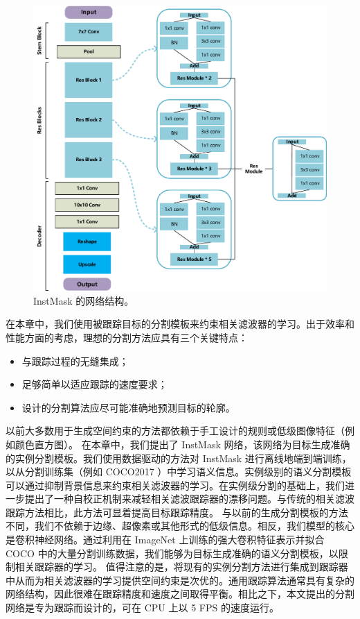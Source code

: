 \begin{figure}[t]
    \centering
    \includegraphics[width=1.0\textwidth]{Img/IGCF/net.pdf}
    \caption{InstMask 的网络结构。}
    \label{fig:net}
\end{figure}

在本章中，我们使用被跟踪目标的分割模板来约束相关滤波器的学习。出于效率和性能方面的考虑，理想的分割方法应具有三个关键特点：

\begin{itemize}
\item 与跟踪过程的无缝集成；
\item 足够简单以适应跟踪的速度要求；
\item 设计的分割算法应尽可能准确地预测目标的轮廓。
\end{itemize}

以前大多数用于生成空间约束的方法都依赖于手工设计的规则或低级图像特征（例如颜色直方图）。
在本章中，我们提出了 InstMask 网络，该网络为目标生成准确的实例分割模板。我们使用数据驱动的方法对 InstMask 进行离线地端到端训练，以从分割训练集（例如 COCO2017 \cite{COCO}）中学习语义信息。实例级别的语义分割模板可以通过抑制背景信息来约束相关滤波器的学习。在实例级分割的基础上，我们进一步提出了一种自校正机制来减轻相关滤波跟踪器的漂移问题。与传统的相关滤波跟踪方法相比，此方法可显着提高目标跟踪精度。
与以前的生成分割模板的方法不同，我们不依赖于边缘、超像素或其他形式的低级信息。相反，我们模型的核心是卷积神经网络。通过利用在 ImageNet \cite{ImageNet} 上训练的强大卷积特征表示并拟合 COCO 中的大量分割训练数据，我们能够为目标生成准确的语义分割模板，以限制相关跟踪器的学习。
值得注意的是，将现有的实例分割方法进行集成到跟踪器中从而为相关滤波器的学习提供空间约束是次优的。通用跟踪算法通常具有复杂的网络结构，因此很难在跟踪精度和速度之间取得平衡。相比之下，本文提出的分割网络是专为跟踪而设计的，可在 CPU 上以 5 FPS 的速度运行。

